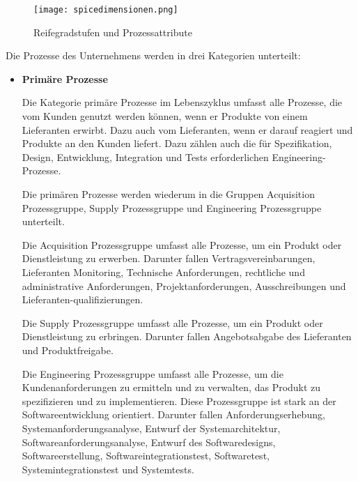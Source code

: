 \begin{figure}[H]
  \centering
  \caption{Reifegradstufen und Prozessattribute}
  \texttt{[image: spicedimensionen.png]}
  \label{fig:spicedimensionen}
\end{figure}

Die Prozesse des Unternehmens werden in drei Kategorien unterteilt:

\begin{itemize}
  \item \textbf{Primäre Prozesse} \par \glqq Die Kategorie primäre Prozesse im Lebenszyklus umfasst alle Prozesse, die vom Kunden genutzt werden können, wenn er Produkte von einem Lieferanten erwirbt. Dazu auch vom Lieferanten, wenn er darauf reagiert und Produkte an den Kunden liefert. Dazu zählen auch die für Spezifikation, Design, Entwicklung, Integration und Tests erforderlichen Engineering-Prozesse.\grqq{} \par
  Die primären Prozesse werden wiederum in die Gruppen Acquisition Prozessgruppe, Supply Prozessgruppe und Engineering Prozessgruppe unterteilt.\par
  Die Acquisition Prozessgruppe umfasst alle Prozesse, um ein Produkt oder Dienstleistung zu erwerben. Darunter fallen Vertragsvereinbarungen, Lieferanten Monitoring, Technische Anforderungen, rechtliche und administrative Anforderungen, Projektanforderungen, Ausschreibungen und Lieferanten-qualifizierungen.\par
  Die Supply Prozessgruppe umfasst alle Prozesse, um ein Produkt oder Dienstleistung zu erbringen. Darunter fallen Angebotsabgabe des Lieferanten und Produktfreigabe.\par
  Die Engineering Prozessgruppe umfasst alle Prozesse, um die Kundenanforderungen zu ermitteln und zu verwalten, das Produkt zu spezifizieren und zu implementieren. Diese Prozessgruppe ist stark an der Softwareentwicklung orientiert. Darunter fallen Anforderungserhebung, Systemanforderungsanalyse, Entwurf der Systemarchitektur, Softwareanforderungsanalyse, Entwurf des Softwaredesigns, Softwareerstellung, Softwareintegrationstest, Softwaretest, Systemintegrationstest und Systemtests.


\end{itemize}
